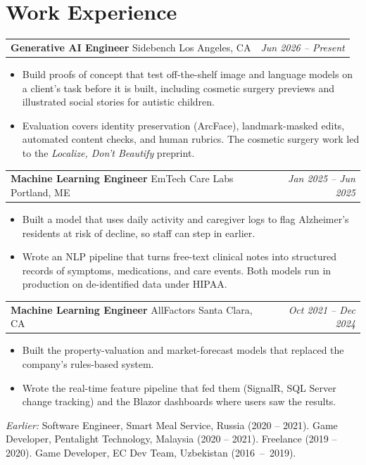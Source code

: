 \documentclass[letterpaper,11pt]{article}
\makeatletter
\newcommand{\experienceEntry}[4]{%
    \vspace{3pt}\noindent
    \begin{tabular*}{\textwidth}{@{}l@{\extracolsep{\fill}}r@{}}
        \textbf{\color{darktext}#1} {\color{lighttext}\textbar} {\color{accent}#2} {\color{lighttext}\textbar} {\color{lighttext}#3} & \textit{\color{lighttext}#4} \\
    \end{tabular*}\vspace{-4pt}
}
\makeatother
\begin{document}
\section{Work Experience}

\experienceEntry{Generative AI Engineer}{Sidebench}{Los Angeles, CA}{Jun 2026 -- Present}
\begin{itemize}
    \item Build proofs of concept that test off-the-shelf image and language models on a client's task before it is built, including cosmetic surgery previews and illustrated social stories for autistic children.
    \item Evaluation covers identity preservation (ArcFace), landmark-masked edits, automated content checks, and human rubrics. The cosmetic surgery work led to the \textit{Localize, Don't Beautify} preprint.
\end{itemize}

\experienceEntry{Machine Learning Engineer}{EmTech Care Labs}{Portland, ME}{Jan 2025 -- Jun 2025}
\begin{itemize}
    \item Built a model that uses daily activity and caregiver logs to flag Alzheimer's residents at risk of decline, so staff can step in earlier.
    \item Wrote an NLP pipeline that turns free-text clinical notes into structured records of symptoms, medications, and care events. Both models run in production on de-identified data under HIPAA.
\end{itemize}

\experienceEntry{Machine Learning Engineer}{AllFactors}{Santa Clara, CA}{Oct 2021 -- Dec 2024}
\begin{itemize}
    \item Built the property-valuation and market-forecast models that replaced the company's rules-based system.
    \item Wrote the real-time feature pipeline that fed them (SignalR, SQL Server change tracking) and the Blazor dashboards where users saw the results.
\end{itemize}

\vspace{5pt}\noindent
{\color{lighttext}\textit{Earlier:} Software Engineer, Smart Meal Service, Russia (2020 -- 2021). Game Developer, Pentalight Technology, Malaysia (2020 -- 2021). Freelance (2019 -- 2020). Game Developer, EC Dev Team, Uzbekistan (2016~--~2019).}
\end{document}
